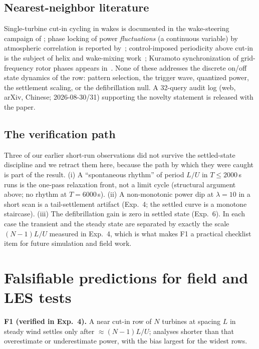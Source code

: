 \documentclass[11pt]{article}
\begin{document}
\subsection{Nearest-neighbor literature}

Single-turbine cut-in cycling in wakes is documented in the wake-steering campaign of
\cite{Howland2019}; phase locking of power \emph{fluctuations} (a continuous variable) by
atmospheric correlation is reported by~\cite{Anvari2016}; control-imposed periodicity above
cut-in is the subject of helix and wake-mixing work~\cite{Korb2020,VanVondelen2024};
Kuramoto synchronization of grid-frequency rotor phases appears in~\cite{arXivKuramoto}.
None of these addresses the discrete on/off state dynamics of the row: pattern selection,
the trigger wave, quantized power, the settlement scaling, or the defibrillation null. A
32-query audit log (web, arXiv, Chinese; 2026-08-30/31) supporting the novelty statement is
released with the paper.

\subsection{The verification path}

Three of our earlier short-run observations did not survive the settled-state discipline and
we retract them here, because the path by which they were caught is part of the result.
(i) A ``spontaneous rhythm'' of period $L/U$ in $T\le 2000$\,s runs is the one-pass
relaxation front, not a limit cycle (structural argument above; no rhythm at $T=6000$\,s).
(ii) A non-monotonic power dip at $\lambda=10$ in a short scan is a tail-settlement artifact
(Exp.~4; the settled curve is a monotone staircase). (iii) The defibrillation gain is zero
in settled state (Exp.~6). In each case the transient and the steady state are separated by
exactly the scale $(N-1)L/U$ measured in Exp.~4, which is what makes F1 a practical
checklist item for future simulation and field work.

\section{Falsifiable predictions for field and LES tests}
\label{sec:predictions}

\textbf{F1 (verified in Exp.~4).} A near cut-in row of $N$ turbines at spacing $L$ in steady
wind settles only after $\approx (N-1)L/U$; analyses shorter than that overestimate or
underestimate power, with the bias largest for the widest rows.
\end{document}
